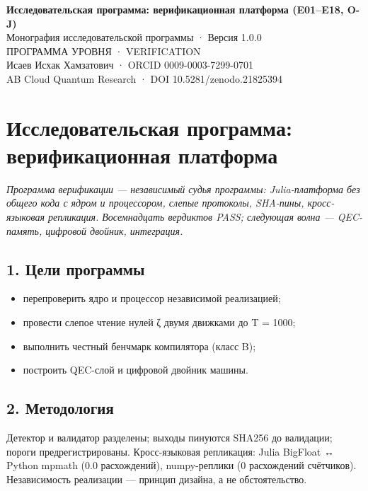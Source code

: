 \documentclass[11pt,a4paper]{article}
\begin{document}
\begin{center}
{\LARGE\bfseries Исследовательская программа: верификационная платформа (E01–E18, O-J)}\\[8pt]
{\large Монография исследовательской программы · Версия 1.0.0}\\[6pt]
{\color{copper}\small ПРОГРАММА УРОВНЯ · VERIFICATION}\\[4pt]
{\small Исаев Исхак Хамзатович · ORCID 0009-0003-7299-0701}\\[2pt]
{\small AB Cloud Quantum Research · DOI 10.5281/zenodo.21825394}
\end{center}

\tableofcontents
\newpage

\section{Исследовательская программа: верификационная платформа}

\noindent\textit{\color{copper}Программа верификации — независимый судья программы: Julia-платформа без общего кода с ядром и процессором, слепые протоколы, SHA-пины, кросс-языковая репликация. Восемнадцать вердиктов PASS; следующая волна — QEC-память, цифровой двойник, интеграция.}

\subsection{1. Цели программы}

\begin{itemize}
  \item перепроверить ядро и процессор независимой реализацией;
  \item провести слепое чтение нулей ζ двумя движками до T = 1000;
  \item выполнить честный бенчмарк компилятора (класс B);
  \item построить QEC-слой и цифровой двойник машины.
\end{itemize}

\subsection{2. Методология}

Детектор и валидатор разделены; выходы пинуются SHA256 до валидации; пороги предрегистрированы. Кросс-языковая репликация: Julia BigFloat ↔ Python mpmath (0.0 расхождений), numpy-реплики (0 расхождений счётчиков). Независимость реализации — принцип дизайна, а не обстоятельство.
\end{document}
